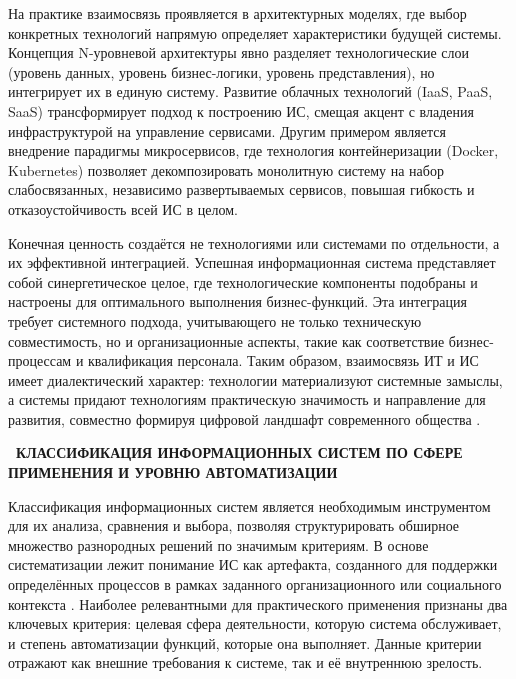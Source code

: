 \documentclass{SibFU-docs}
\begin{document}

На практике взаимосвязь проявляется в архитектурных моделях, где выбор конкретных технологий напрямую определяет характеристики будущей системы. Концепция N-уровневой архитектуры явно разделяет технологические слои (уровень данных, уровень бизнес-логики, уровень представления), но интегрирует их в единую систему. Развитие облачных технологий (IaaS, PaaS, SaaS) трансформирует подход к построению ИС, смещая акцент с владения инфраструктурой на управление сервисами. Другим примером является внедрение парадигмы микросервисов, где технология контейнеризации (Docker, Kubernetes) позволяет декомпозировать монолитную систему на набор слабосвязанных, независимо развертываемых сервисов, повышая гибкость и отказоустойчивость всей ИС в целом.


Конечная ценность создаётся не технологиями или системами по отдельности, а их эффективной интеграцией. Успешная информационная система представляет собой синергетическое целое, где технологические компоненты подобраны и настроены для оптимального выполнения бизнес-функций. Эта интеграция требует системного подхода, учитывающего не только техническую совместимость, но и организационные аспекты, такие как соответствие бизнес-процессам и квалификация персонала. Таким образом, взаимосвязь ИТ и ИС имеет диалектический характер: технологии материализуют системные замыслы, а системы придают технологиям практическую значимость и направление для развития, совместно формируя цифровой ландшафт современного общества \cite{is-definition}.

\newpage
{}
\begin{center}\textbf{\thesection\ КЛАССИФИКАЦИЯ ИНФОРМАЦИОННЫХ СИСТЕМ ПО СФЕРЕ ПРИМЕНЕНИЯ И УРОВНЮ АВТОМАТИЗАЦИИ}\end{center}
\vspace*{-1.5em}

Классификация информационных систем является необходимым инструментом для их анализа, сравнения и выбора, позволяя структурировать обширное множество разнородных решений по значимым критериям. В основе систематизации лежит понимание ИС как артефакта, созданного для поддержки определённых процессов в рамках заданного организационного или социального контекста \cite{iso-iec-15288}. Наиболее релевантными для практического применения признаны два ключевых критерия: целевая сфера деятельности, которую система обслуживает, и степень автоматизации функций, которые она выполняет. Данные критерии отражают как внешние требования к системе, так и её внутреннюю зрелость.
\end{document}
